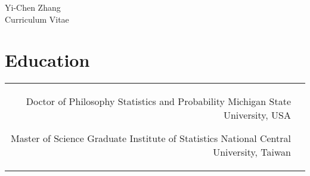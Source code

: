 \documentclass[10pt]{article} %
\begin{document}
\begin{paracol}{2} %


  \parbox[top][0.12\textheight][c]{\linewidth}{ %
    \vspace{-0.04\textheight} %
    \centering %
    {\sffamily\Huge Yi-Chen Zhang}\\%
    {\Huge\color{headings}\cvtextfont Curriculum Vitae}
  }


  \section{Education} 





  \begin{supertabular}{rl} %


    {Doctor of Philosophy} %
    {} %
    {Statistics and Probability} %
    {Michigan State University, USA} %


    {Master of Science} %
    {} %
    {Graduate Institute of Statistics} %
    {National Central University, Taiwan} %


\end{supertabular}
\end{paracol}
\end{document}

